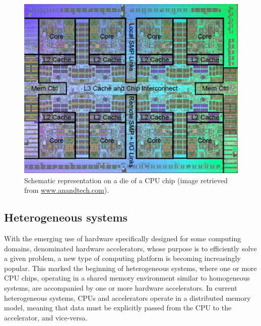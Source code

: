 \begin{figure}[!htp]
	\begin{center}
		\includegraphics[scale=4]{../../common/img/cpu_scheme.jpg}
		\caption{Schematic representation on a die of a CPU chip (image retrieved from \url{www.anandtech.com}).}
		\label{fig:CPUChip}
	\end{center}
\end{figure}

\subsection{Heterogeneous systems}
\label{HeterogeneousSystems}

With the emerging use of hardware specifically designed for some computing domains, denominated hardware accelerators, whose purpose is to efficiently solve a given problem, a new type of computing platform is becoming increasingly popular. This marked the beginning of heterogeneous systems, where one or more CPU chips, operating in a shared memory environment similar to homogeneous systems, are accompanied by one or more hardware accelerators. In current heterogeneous systems, CPUs and accelerators operate in a distributed memory model, meaning that data must be explicitly passed from the CPU to the accelerator, and vice-versa.

